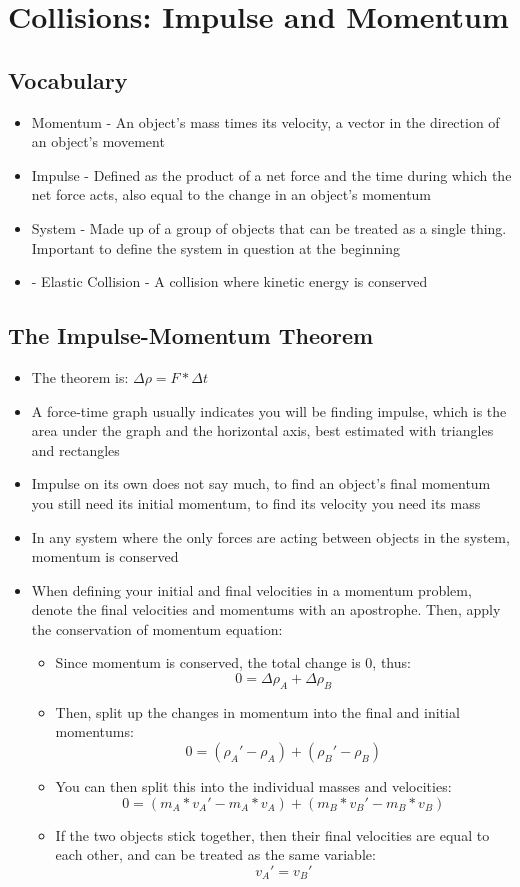 \section{Collisions: Impulse and Momentum}

\subsection{Vocabulary}
\begin{itemize}
    \item Momentum - An object's mass times its velocity, a vector in the direction of an object's movement
    \item Impulse - Defined as the product of a net force and the time during which the net force acts, also equal to the change in an object's momentum
    \item System - Made up of a group of objects that can be treated as a single thing. Important to define the system in question at the beginning 
    \item - Elastic Collision - A collision where kinetic energy is conserved
\end{itemize}

\subsection{The Impulse-Momentum Theorem}
\begin{itemize}
    \item The theorem is: \(\Delta\rho=F*\Delta t\)
    \item A force-time graph usually indicates you will be finding impulse, which is the area under the graph and the horizontal axis, best estimated with triangles and rectangles
    \item Impulse on its own does not say much, to find an object's final momentum you still need its initial momentum, to find its velocity you need its mass
    \item In any system where the only forces are acting between objects in the system, momentum is conserved
    \item When defining your initial and final velocities in a momentum problem, denote the final velocities and momentums with an apostrophe. Then, apply the conservation of momentum equation:
    \begin{itemize}
        \item Since momentum is conserved, the total change is 0, thus: \[0=\Delta\rho_A+\Delta\rho_B\]
        \item Then, split up the changes in momentum into the final and initial momentums: \[0=(\rho_A'-\rho_A)+(\rho_B'-\rho_B)\]
        \item You can then split this into the individual masses and velocities: \[0=(m_A*v_A'-m_A*v_A)+(m_B*v_B'-m_B*v_B)\]
        \item If the two objects stick together, then their final velocities are equal to each other, and can be treated as the same variable: \[v_A'=v_B'\]
    \end{itemize}
\end{itemize}

